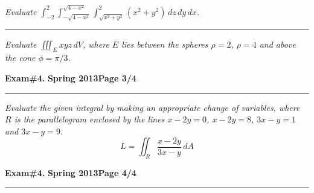 \documentclass[12pt]{article}
\begin{document}
\bigskip
{\problem[25 pts] \em Evaluate $\displaystyle{\int_{-2}^2
\int_{-\sqrt{4-x^2}}^{\sqrt{4-x^2}} \int_{\sqrt{x^2+y^2}}^{2}
(x^2+y^2)\, dz\, dy\, dx}$.}
\vspace{6cm}
\begin{flushright}
\end{flushright}
\hrule
{\problem[25 pts] \em Evaluate $\displaystyle{\iiint_E xyz\, dV}$, where
$E$ lies between the spheres $\rho=2$, $\rho=4$ and above the cone
$\phi=\pi/3$.}
\vspace{10cm}
\begin{flushright}
\end{flushright}
\newpage

\hfill{\large\bf Exam\#4.}\hfill{\large\bf
  Spring 2013}\hfill{\large\bf Page 3/4}\hrule

\bigskip
{\problem[50 pts] \em Evaluate the given integral by making an appropriate
change of variables, where $R$ is the parallelogram enclosed by the lines
$x-2y=0$, $x-2y=8$, $3x-y=1$ and $3x-y=9$.}
\begin{equation*}
L = \iint_R \frac{x-2y}{3x-y}\, dA
\end{equation*}
\vspace{18cm}
\begin{flushright}
\end{flushright}
\newpage

\hfill{\large\bf Exam\#4.}\hfill{\large\bf
  Spring 2013}\hfill{\large\bf Page 4/4}\hrule
\end{document}
